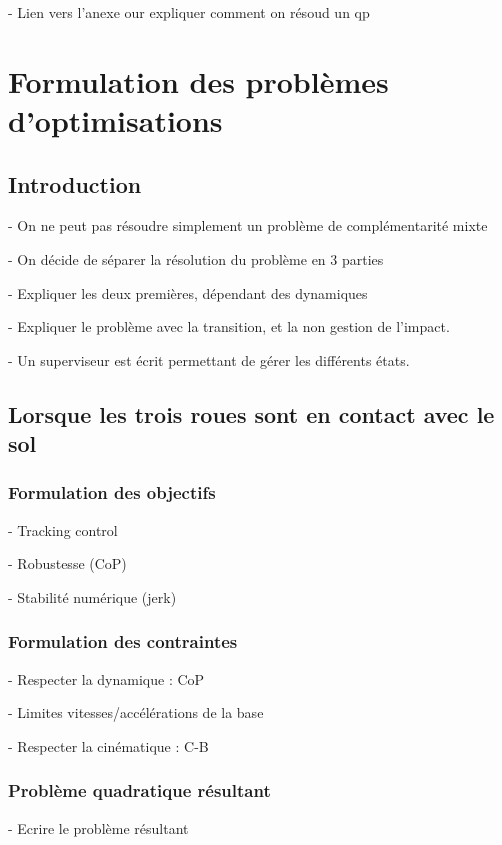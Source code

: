 			- Lien vers l'anexe our expliquer comment on résoud un qp

	\section{Formulation des problèmes d'optimisations}
		\subsection{Introduction}

			- On ne peut pas résoudre simplement un problème de complémentarité mixte

			- On décide de séparer la résolution du problème en 3 parties

			- Expliquer les deux premières, dépendant des dynamiques

			- Expliquer le problème avec la transition, et la non gestion de l'impact.

			- Un superviseur est écrit permettant de gérer les différents états.

		\subsection{Lorsque les trois roues sont en contact avec le sol}
			\label{section.mpc_trois_roues}
			\subsubsection{Formulation des objectifs}
			\label{section.objectifs3roues}

				- Tracking control

				- Robustesse (CoP)

				- Stabilité numérique (jerk)

			\subsubsection{Formulation des contraintes}

				- Respecter la dynamique : CoP

				- Limites vitesses/accélérations de la base

				- Respecter la cinématique : C-B

			\subsubsection{Problème quadratique résultant}
		
				- Ecrire le problème résultant

